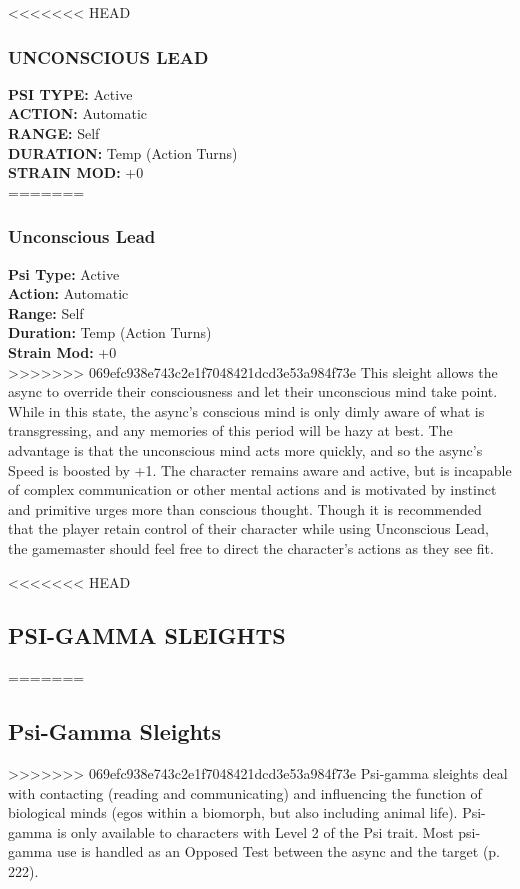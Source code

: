 <<<<<<< HEAD
\subsubsection{UNCONSCIOUS LEAD}
\textbf{PSI TYPE:} Active \\ 
\textbf{ACTION:} Automatic \\ 
\textbf{RANGE:} Self \\ 
\textbf{DURATION:} Temp (Action Turns) \\
\textbf{STRAIN MOD:} +0 \\
=======
\subsubsection{Unconscious Lead}
\textbf{Psi Type:} Active \\ 
\textbf{Action:} Automatic \\ 
\textbf{Range:} Self \\ 
\textbf{Duration:} Temp (Action Turns) \\
\textbf{Strain Mod:} +0 \\
>>>>>>> 069efc938e743c2e1f7048421dcd3e53a984f73e
This sleight allows the async to override their consciousness
and let their unconscious mind take point.
While in this state, the async’s conscious mind is only
dimly aware of what is transgressing, and any memories
of this period will be hazy at best. The advantage
is that the unconscious mind acts more quickly, and
so the async’s Speed is boosted by +1. The character
remains aware and active, but is incapable of complex
communication or other mental actions and is
motivated by instinct and primitive urges more than
conscious thought. Though it is recommended that
the player retain control of their character while using
Unconscious Lead, the gamemaster should feel free to
direct the character’s actions as they see fit.


<<<<<<< HEAD
\subsection{PSI-GAMMA SLEIGHTS}
=======
\subsection{Psi-Gamma Sleights}
>>>>>>> 069efc938e743c2e1f7048421dcd3e53a984f73e
Psi-gamma sleights deal with contacting (reading
and communicating) and influencing the function of
biological minds (egos within a biomorph, but also
including animal life). Psi-gamma is only available to
characters with Level 2 of the Psi trait.
Most psi-gamma use is handled as an Opposed Test
between the async and the target (p. 222).


